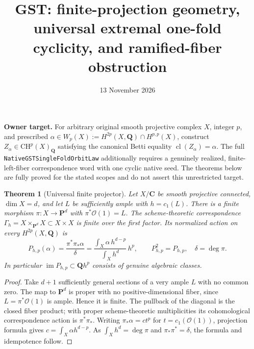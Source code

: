 \documentclass[11pt]{article}
\title{GST: finite-projection geometry, universal extremal one-fold cyclicity, and ramified-fiber obstruction}
\date{13 November 2026}
\newtheorem{theorem}{Theorem}
\newcommand{\Q}{\mathbf Q}
\newcommand{\PP}{\mathbf P}
\newcommand{\CH}{\mathrm{CH}}
\newcommand{\cl}{\operatorname{cl}}
\begin{document}
\maketitle
\noindent\textbf{Owner target.} For arbitrary original smooth projective complex \(X\), integer \(p\), and prescribed \(\alpha\in W_p(X):=H^{2p}(X,\Q)\cap H^{p,p}(X)\), construct \(Z_\alpha\in\CH^p(X)_\Q\) satisfying the canonical Betti equality \(\cl(Z_\alpha)=\alpha\). The full \texttt{NativeGSTSingleFoldOrbitLaw} additionally requires a genuinely realized, finite-left-fiber correspondence word with one cyclic native seed. The theorems below are fully proved for the stated scopes and do not assert this unrestricted target.

\begin{theorem}[Universal finite projector]
Let \(X/\mathbf C\) be smooth projective connected, \(\dim X=d\), and let \(L\) be sufficiently ample with \(h=c_1(L)\). There is a finite morphism \(\pi:X\to\PP^d\) with \(\pi^*\mathcal O(1)=L\). The scheme-theoretic correspondence \(\Gamma_h=X\times_{\PP^d}X\subset X\times X\) is finite over the first factor. Its normalized action on every \(H^{2p}(X,\Q)\) is
\[
\boxed{P_{h,p}(\alpha)=\frac{\pi^*\pi_*\alpha}{\delta}
=\frac{\int_X\alpha\,h^{d-p}}{\int_Xh^d}\,h^p,\qquad P_{h,p}^2=P_{h,p},\quad \delta=\deg\pi.}
\]
In particular \(\operatorname{im}P_{h,p}\subset\Q h^p\) consists of genuine algebraic classes.
\end{theorem}
\begin{proof}
Take \(d+1\) sufficiently general sections of a very ample \(L\) with no common zero. The map to \(\PP^d\) is proper with no positive-dimensional fiber, since \(L=\pi^*\mathcal O(1)\) is ample. Hence it is finite. The pullback of the diagonal is the closed fiber product; with proper scheme-theoretic multiplicities its cohomological correspondence action is \(\pi^*\pi_*\). Writing \(\pi_*\alpha=c t^p\) for \(t=c_1(\mathcal O(1))\), projection formula gives \(c=\int_X\alpha h^{d-p}\). As \(\int_Xh^d=\deg\pi\) and \(\pi_*\pi^*=\delta\), the formula and idempotence follow.
\end{proof}
\end{document}
